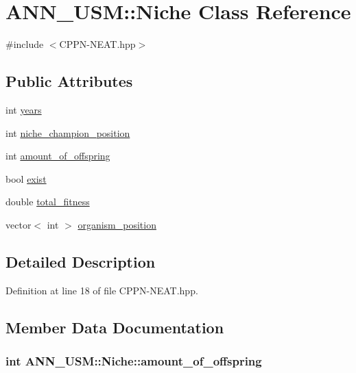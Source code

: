 \hypertarget{class_a_n_n___u_s_m_1_1_niche}{\section{A\-N\-N\-\_\-\-U\-S\-M\-:\-:Niche Class Reference}
\label{class_a_n_n___u_s_m_1_1_niche}
}


{\ttfamily \#include $<$C\-P\-P\-N-\/\-N\-E\-A\-T.\-hpp$>$}

\subsection*{Public Attributes}
\begin{DoxyCompactItemize}
\item 
int \hyperlink{class_a_n_n___u_s_m_1_1_niche_a60d2ec0e62180968e1f93e1c8751a593}{years}
\item 
int \hyperlink{class_a_n_n___u_s_m_1_1_niche_ab599fd202191fbdfc79ebea0e71133f6}{niche\-\_\-champion\-\_\-position}
\item 
int \hyperlink{class_a_n_n___u_s_m_1_1_niche_a3efd949f8a9927837983df316e0bb5c4}{amount\-\_\-of\-\_\-offspring}
\item 
bool \hyperlink{class_a_n_n___u_s_m_1_1_niche_a29d8b9a3261b0eac3633dd909e048f64}{exist}
\item 
double \hyperlink{class_a_n_n___u_s_m_1_1_niche_a7be1952c8162924d1d0f95f6445f755b}{total\-\_\-fitness}
\item 
vector$<$ int $>$ \hyperlink{class_a_n_n___u_s_m_1_1_niche_ae25e893af8d8a91f5b666f4bc7d70edc}{organism\-\_\-position}
\end{DoxyCompactItemize}


\subsection{Detailed Description}


Definition at line 18 of file C\-P\-P\-N-\/\-N\-E\-A\-T.\-hpp.



\subsection{Member Data Documentation}
\hypertarget{class_a_n_n___u_s_m_1_1_niche_a3efd949f8a9927837983df316e0bb5c4}{
\subsubsection[{amount\-\_\-of\-\_\-offspring}]{\setlength{\rightskip}{0pt plus 5cm}int A\-N\-N\-\_\-\-U\-S\-M\-::\-Niche\-::amount\-\_\-of\-\_\-offspring}}\label{class_a_n_n___u_s_m_1_1_niche_a3efd949f8a9927837983df316e0bb5c4}


